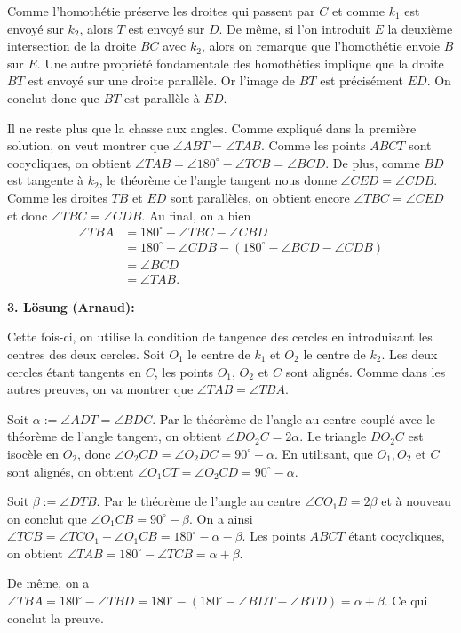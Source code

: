 \documentclass[language=german,style=solution]{smo}
\begin{document}
\begin{enumerate}
Comme l'homothétie préserve les droites qui passent par $C$ et comme $k_1$ est envoyé sur $k_2$, alors $T$ est envoyé sur $D$. De même, si l'on introduit $E$ la deuxième intersection de la droite $BC$ avec $k_2$, alors on remarque que l'homothétie envoie $B$ sur $E$. Une autre propriété fondamentale des homothéties implique que la droite $BT$ est envoyé sur une droite parallèle. Or l'image de $BT$ est précisément $ED$. On conclut donc que $BT$ est parallèle à $ED$.

Il ne reste plus que la chasse aux angles. Comme expliqué dans la première solution, on veut montrer que $\angle ABT=\angle TAB$. Comme les points $ABCT$ sont cocycliques, on obtient $\angle TAB=\angle 180^\circ -\angle TCB=\angle BCD$. De plus, comme $BD$ est tangente à $k_2$, le théorème de l'angle tangent nous donne $\angle CED=\angle CDB$. Comme les droites $TB$ et $ED$ sont parallèles, on obtient encore $\angle TBC=\angle CED$ et donc $\angle TBC=\angle CDB$. Au final, on a bien
\begin{align*}
\angle TBA&=180^\circ -\angle TBC-\angle CBD\\
&=180^\circ -\angle CDB-(180^\circ -\angle BCD-\angle CDB)\\
&= \angle BCD\\
&=\angle TAB.
\end{align*}

\textbf{3. Lösung (Arnaud):}

Cette fois-ci, on utilise la condition de tangence des cercles en introduisant les centres des deux cercles. Soit $O_1$ le centre de $k_1$ et $O_2$ le centre de $k_2$. Les deux cercles étant tangents en $C$, les points $O_1$, $O_2$ et $C$ sont alignés. Comme dans les autres preuves, on va montrer que $\angle TAB=\angle TBA$.

Soit $\alpha:=\angle ADT=\angle BDC$. Par le théorème de l'angle au centre couplé avec le théorème de l'angle tangent, on obtient $\angle DO_2C=2\alpha$. Le triangle $DO_2C$ est isocèle en $O_2$, donc $\angle O_2CD=\angle O_2DC=90^\circ -\alpha$. En utilisant, que $O_1,O_2$ et $C$ sont alignés, on obtient $\angle O_1CT=\angle O_2CD=90^\circ-\alpha$.

Soit $\beta:=\angle DTB$. Par le théorème de l'angle au centre $\angle CO_1B=2\beta$ et à nouveau on conclut que $\angle O_1CB=90^\circ-\beta$. On a ainsi $\angle TCB=\angle TCO_1+\angle O_1CB=180^\circ-\alpha-\beta$. Les points $ABCT$ étant cocycliques, on obtient $\angle TAB=180^\circ-\angle TCB=\alpha+\beta$.

De même, on a $\angle TBA=180^\circ -\angle TBD=180^\circ-(180^\circ-\angle BDT-\angle BTD)=\alpha+\beta$. Ce qui conclut la preuve.


\end{enumerate}
\end{document}
